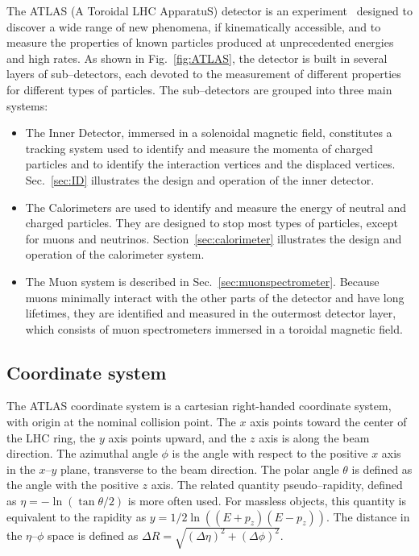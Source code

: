 The ATLAS (A Toroidal LHC ApparatuS) detector is an
experiment~\cite{detectorpaper} designed to discover a wide range of
new phenomena, if kinematically accessible, and to measure the
properties of known particles produced at unprecedented energies and
high rates.
As shown in Fig.~\ref{fig:ATLAS}, the detector is built in several
layers of sub--detectors, each devoted to the measurement of different
properties for different types of particles. The sub--detectors are
grouped into three main systems: 

\begin{itemize}
\item The Inner Detector, immersed in
  a solenoidal magnetic field, constitutes a tracking system used to
  identify and measure the momenta of charged particles and to
  identify the interaction vertices and the displaced
  vertices. Sec.~\ref{sec:ID} illustrates the design and operation of
  the inner detector.
\item The Calorimeters are used to identify and measure the energy of
  neutral and charged particles. They are designed to stop most types
  of particles, except for muons and
  neutrinos. Section~\ref{sec:calorimeter} illustrates the design and
  operation of the calorimeter system. 
\item The Muon system is described in
  Sec.~\ref{sec:muonspectrometer}. Because muons minimally interact
  with the other parts of the detector and have long lifetimes, they
  are identified and measured in the outermost detector layer, which
  consists of muon spectrometers immersed in a toroidal magnetic
  field. 
\end{itemize}

\subsection{Coordinate system}
\label{sec:coords}

The ATLAS coordinate system is a cartesian right-handed coordinate
system, with origin at the nominal collision point. The $x$ axis
points toward the center of the LHC ring, the $y$ axis points upward,
and the $z$ axis is along the beam direction. The azimuthal angle
$\phi$ is the angle with respect to the positive $x$ axis in the
$x$--$y$ plane, transverse to the beam direction. The polar angle
$\theta$ is defined as the angle with the positive $z$ axis. The
related quantity pseudo--rapidity, defined as \mbox{$\eta
  =-\ln\left(\tan\theta/2\right)$} is more often used. For
massless objects, this quantity is equivalent to the rapidity as
\mbox{$y =1/2\ln\left((E+p_z)(E-p_z)\right)$}. The
distance in the $\eta$--$\phi$ space is defined as \mbox{$\Delta R
  = \sqrt{(\Delta \eta)^2+(\Delta \phi)^2}$}.

